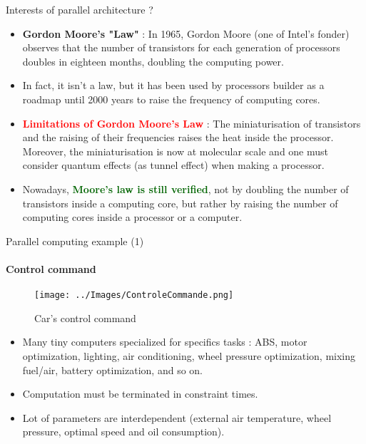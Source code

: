 \documentclass[compress,10pt,aspectratio=169]{beamer}
\begin{document}
\begin{frame}[fragile]{Interests of parallel architecture ?}
    \small
    \begin{itemize}
        \item \textbf{\textcolor{NavyBlue}{Gordon Moore's "Law"}} : In 1965, Gordon Moore (one of Intel's fonder) observes that the number of transistors
              for each generation of processors doubles in eighteen months, doubling the computing power.
        \item In fact, \alert{it isn't a law}, but it has been used by processors builder as a roadmap until 2000 years to raise the frequency
              of computing cores.
        \item \textbf{\textcolor{red}{Limitations of Gordon Moore's Law}} : The miniaturisation of transistors and the raising of their
              frequencies raises the heat inside the processor. Moreover, the miniaturisation is now at molecular scale and one must
              consider quantum effects (as tunnel effect) when making a processor.
        \item Nowadays, \textbf{\textcolor{DarkGreen}{Moore's law is still verified}}, not by doubling the number of transistors 
              inside a computing core, but rather by raising the number of computing cores inside a processor or a computer.
    \end{itemize}
\end{frame}

\begin{frame}[fragile]{Parallel computing example (1)}
    \framesubtitle{Control command}
    \small
    \begin{multicols}{2}
    \begin{figure}[h]      
    \texttt{[image: ../Images/ControleCommande.png]}
    \caption{Car's control command}
    \end{figure}
    \begin{itemize}
        \item Many tiny computers specialized for specifics tasks : ABS, motor optimization, lighting, air conditioning, wheel pressure optimization, 
              mixing fuel/air, battery optimization, and so on.
        \item Computation must be terminated in constraint times.
        \item Lot of parameters are interdependent (external air temperature, wheel pressure, optimal speed and oil consumption).
    \end{itemize}
    \end{multicols}
\end{frame}
\end{document}
